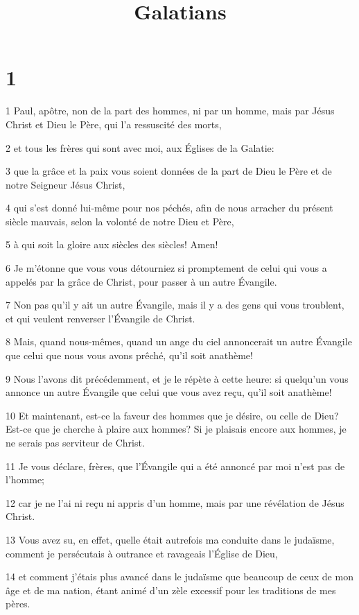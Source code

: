 

\title{Galatians}


\chapter{1}

\par 1 Paul, apôtre, non de la part des hommes, ni par un homme, mais par Jésus Christ et Dieu le Père, qui l'a ressuscité des morts,
\par 2 et tous les frères qui sont avec moi, aux Églises de la Galatie:
\par 3 que la grâce et la paix vous soient données de la part de Dieu le Père et de notre Seigneur Jésus Christ,
\par 4 qui s'est donné lui-même pour nos péchés, afin de nous arracher du présent siècle mauvais, selon la volonté de notre Dieu et Père,
\par 5 à qui soit la gloire aux siècles des siècles! Amen!
\par 6 Je m'étonne que vous vous détourniez si promptement de celui qui vous a appelés par la grâce de Christ, pour passer à un autre Évangile.
\par 7 Non pas qu'il y ait un autre Évangile, mais il y a des gens qui vous troublent, et qui veulent renverser l'Évangile de Christ.
\par 8 Mais, quand nous-mêmes, quand un ange du ciel annoncerait un autre Évangile que celui que nous vous avons prêché, qu'il soit anathème!
\par 9 Nous l'avons dit précédemment, et je le répète à cette heure: si quelqu'un vous annonce un autre Évangile que celui que vous avez reçu, qu'il soit anathème!
\par 10 Et maintenant, est-ce la faveur des hommes que je désire, ou celle de Dieu? Est-ce que je cherche à plaire aux hommes? Si je plaisais encore aux hommes, je ne serais pas serviteur de Christ.
\par 11 Je vous déclare, frères, que l'Évangile qui a été annoncé par moi n'est pas de l'homme;
\par 12 car je ne l'ai ni reçu ni appris d'un homme, mais par une révélation de Jésus Christ.
\par 13 Vous avez su, en effet, quelle était autrefois ma conduite dans le judaïsme, comment je persécutais à outrance et ravageais l'Église de Dieu,
\par 14 et comment j'étais plus avancé dans le judaïsme que beaucoup de ceux de mon âge et de ma nation, étant animé d'un zèle excessif pour les traditions de mes pères.
